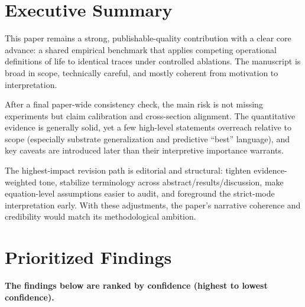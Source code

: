 \documentclass[11pt]{article}
\begin{document}
\section*{Executive Summary}
This paper remains a strong, publishable-quality contribution with a clear core advance: a shared empirical benchmark that applies competing operational definitions of life to identical traces under controlled ablations. The manuscript is broad in scope, technically careful, and mostly coherent from motivation to interpretation.

After a final paper-wide consistency check, the main risk is not missing experiments but claim calibration and cross-section alignment. The quantitative evidence is generally solid, yet a few high-level statements overreach relative to scope (especially substrate generalization and predictive ``best'' language), and key caveats are introduced later than their interpretive importance warrants.

The highest-impact revision path is editorial and structural: tighten evidence-weighted tone, stabilize terminology across abstract/results/discussion, make equation-level assumptions easier to audit, and foreground the strict-mode interpretation early. With these adjustments, the paper's narrative coherence and credibility would match its methodological ambition.

\section*{Prioritized Findings}
\textbf{The findings below are ranked by confidence (highest to lowest confidence).}
\end{document}
